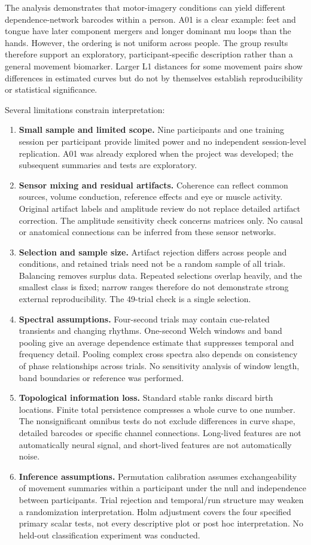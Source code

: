 The analysis demonstrates that motor-imagery conditions can yield different dependence-network barcodes within a person. A01 is a clear example: feet and tongue have later component mergers and longer dominant mu loops than the hands. However, the ordering is not uniform across people. The group results therefore support an exploratory, participant-specific description rather than a general movement biomarker. Larger L1 distances for some movement pairs show differences in estimated curves but do not by themselves establish reproducibility or statistical significance.

Several limitations constrain interpretation:
\begin{enumerate}
\item \textbf{Small sample and limited scope.} Nine participants and one training session per participant provide limited power and no independent session-level replication. A01 was already explored when the project was developed; the subsequent summaries and tests are exploratory.
\item \textbf{Sensor mixing and residual artifacts.} Coherence can reflect common sources, volume conduction, reference effects and eye or muscle activity. Original artifact labels and amplitude review do not replace detailed artifact correction. The amplitude sensitivity check concerns matrices only. No causal or anatomical connections can be inferred from these sensor networks.
\item \textbf{Selection and sample size.} Artifact rejection differs across people and conditions, and retained trials need not be a random sample of all trials. Balancing removes surplus data. Repeated selections overlap heavily, and the smallest class is fixed; narrow ranges therefore do not demonstrate strong external reproducibility. The 49-trial check is a single selection.
\item \textbf{Spectral assumptions.} Four-second trials may contain cue-related transients and changing rhythms. One-second Welch windows and band pooling give an average dependence estimate that suppresses temporal and frequency detail. Pooling complex cross spectra also depends on consistency of phase relationships across trials. No sensitivity analysis of window length, band boundaries or reference was performed.
\item \textbf{Topological information loss.} Standard stable ranks discard birth locations. Finite total persistence compresses a whole curve to one number. The nonsignificant omnibus tests do not exclude differences in curve shape, detailed barcodes or specific channel connections. Long-lived features are not automatically neural signal, and short-lived features are not automatically noise.
\item \textbf{Inference assumptions.} Permutation calibration assumes exchangeability of movement summaries within a participant under the null and independence between participants. Trial rejection and temporal/run structure may weaken a randomization interpretation. Holm adjustment covers the four specified primary scalar tests, not every descriptive plot or post hoc interpretation. No held-out classification experiment was conducted.
\end{enumerate}

